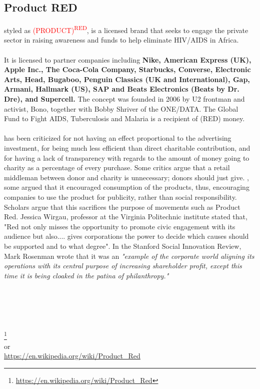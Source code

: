 \documentclass[12pt,a4paper]{article}
\begin{document}
{	\subsection{Product RED}
	\label{productred}
	styled as \textcolor{red}{(PRODUCT)\textsuperscript{RED}}, is a licensed brand that seeks to engage the private sector in raising awareness and funds to help eliminate HIV/AIDS in Africa.\\
	\\
	It is licensed to partner companies including \textbf{Nike, American Express (UK), Apple Inc., The Coca-Cola Company, Starbucks, Converse, Electronic Arts, Head, Bugaboo, Penguin Classics (UK and International), Gap, Armani, Hallmark (US), SAP and Beats Electronics (Beats by Dr. Dre), and Supercell.} The concept was founded in 2006 by U2 frontman and activist, Bono, together with Bobby Shriver of the ONE/DATA. The Global Fund to Fight AIDS, Tuberculosis and Malaria is a recipient of (RED) money.\\
	\\
	\textsc{} has been criticized for not having an effect proportional to the advertising investment, for being much less efficient than direct charitable contribution, and for having a lack of transparency with regards to the amount of money going to charity as a percentage of every purchase. Some critics argue that a retail middleman between donor and charity is unnecessary; donors should just give. \texttt{}, some argued that it encouraged consumption of the products, thus, encouraging companies to use the product for publicity, rather than social responsibility. Scholars argue that this sacrifices the purpose of movements such as Product Red. Jessica Wirgau, professor at the Virginia Politechnic institute stated that, \textsf{"Red not only misses the opportunity to promote civic engagement with its audience but also.... gives corporations the power to decide which causes should be supported and to what degree".} In the Stanford Social Innovation Review, Mark Rosenman wrote that it was an \textit {"example of the corporate world aligning its operations with its central purpose of increasing shareholder profit, except this time it is being cloaked in the patina of philanthropy."}\\
	\\
	{\tiny {}}\\
	\\
	{\large {}}\\
	\\
	{\huge {}}
	{\footnote{\url{https://en.wikipedia.org/wiki/Product_Red}}
	\\
	or
	\\
	\url{https://en.wikipedia.org/wiki/Product_Red}
	\newpage
}}
\end{document}
